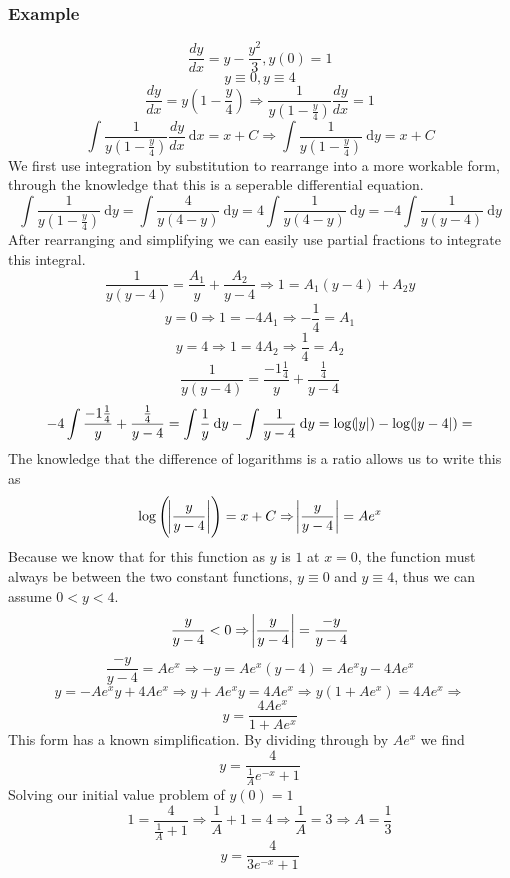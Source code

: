 \documentclass[12pt]{report}
\newcommand{\dx}{\:\mathrm{d}x}
\newcommand{\dy}{\:\mathrm{d}y}
\begin{document}
\begin{flushleft}
\subsubsection*{Example}
\[\frac{dy}{dx} = y - \frac{y^2}{3}, y(0) = 1\]
\[y \equiv 0, y \equiv 4\]
\[\frac{dy}{dx} = y(1 - \frac{y}{4}) 
\Rightarrow \frac{1}{y(1 - \frac{y}{4})}\frac{dy}{dx} = 1\]
\[\int \frac{1}{y(1 - \frac{y}{4})}\frac{dy}{dx}\dx = x + C 
\Rightarrow \int \frac{1}{y(1 - \frac{y}{4})}\dy = x + C\]
We first use integration by substitution to rearrange into a more workable
form, through the knowledge that this is a seperable differential equation.
\[\int \frac{1}{y(1 - \frac{y}{4})} \dy 
= \int \frac{4}{y(4 - y)} \dy
= 4\int \frac{1}{y(4 - y)} \dy
= -4\int \frac{1}{y(y - 4)} \dy\]
After rearranging and simplifying we can easily use partial fractions to
integrate this integral.
\[\frac{1}{y(y - 4)} = \frac{A_1}{y} + \frac{A_2}{y - 4} \Rightarrow
1 = A_1(y - 4) + A_2y\]
\[y = 0 \Rightarrow 1 = -4A_1 \Rightarrow -\frac{1}{4} = A_1\]
\[y = 4 \Rightarrow 1 = 4A_2 \Rightarrow \frac{1}{4} = A_2\]
\[\frac{1}{y(y - 4)} = \frac{-1\frac{1}{4}}{y} + \frac{\frac{1}{4}}{y - 4}\]
\[-4\int \frac{-1\frac{1}{4}}{y} + \frac{\frac{1}{4}}{y - 4} 
= \int \frac{1}{y} \dy - \int \frac{1}{y - 4} \dy 
= \log(\abs{y}) - \log(\abs{y - 4}) = \]
The knowledge that the difference of logarithms is a ratio allows us to write
this as
\[\log\left(\abs{\frac{y}{y - 4}}\right) = x + C 
\Rightarrow \abs{\frac{y}{y - 4}} = Ae^x\]
Because we know that for this function as \(y\) is \(1\) at \(x = 0\), the
function must always be between the two constant functions, \(y \equiv 0\) and
\(y \equiv 4\), thus we can assume \(0 < y < 4\).
\[\frac{y}{y - 4} < 0 \Rightarrow \abs{\frac{y}{y - 4}} = \frac{-y}{y - 4}\]
\[\frac{-y}{y - 4} = Ae^x \Rightarrow -y = Ae^x(y - 4) = Ae^xy - 4Ae^x\]
\[y = -Ae^xy + 4Ae^x \Rightarrow y + Ae^xy = 4Ae^x 
\Rightarrow y(1 + Ae^x) = 4Ae^x \Rightarrow\]
\[y = \frac{4Ae^x}{1 + Ae^x}\]
This form has a known simplification. By dividing through by \(Ae^x\) we find
\[y = \frac{4}{\frac{1}{A}e^{-x} + 1}\]
Solving our initial value problem of \(y(0) = 1\)
\[1 = \frac{4}{\frac{1}{A} + 1} \Rightarrow \frac{1}{A} + 1 = 4 
\Rightarrow \frac{1}{A} = 3 \Rightarrow A = \frac{1}{3}\]
\[y = \frac{4}{3e^{-x} + 1}\]


\end{flushleft}
\end{document}
